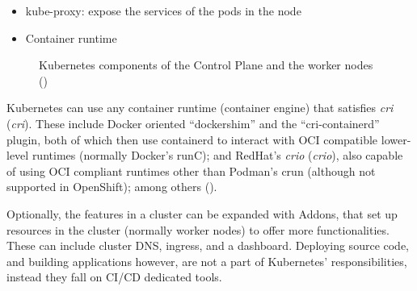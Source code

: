 \documentclass[11pt]{article}
\begin{document}
\begin{flushleft}
\begin{itemize}
            \item kube-proxy: expose the services of the pods in the node
            
            \item Container runtime

        \end{itemize}

    
    \begin{figure}[htb]
		\centering
		\caption{Kubernetes components of the Control Plane and the worker nodes (\cite{kubernetesmarko})}
	\end{figure}

    Kubernetes can use any container runtime (container engine) that satisfies \textit{\acrshort{cri}} (\textit{\acrlong{cri}}). These include Docker oriented ``dockershim'' and the ``cri-containerd'' plugin, both of which then use containerd to interact with OCI compatible lower-level runtimes (normally Docker's runC); and RedHat's \textit{\acrshort{crio}} (\textit{\acrlong{crio}}), also capable of using OCI compliant runtimes other than Podman's crun (although not supported in OpenShift); among others (\cite{k8scri}).
    \linebreak
    
    Optionally, the features in a cluster can be expanded with Addons, that set up resources in the cluster (normally worker nodes) to offer more functionalities. These can include cluster DNS, ingress, and a dashboard. Deploying source code, and building applications however, are not a part of Kubernetes' responsibilities, instead they fall on CI/CD dedicated tools.
    \linebreak
    

\end{flushleft}
\end{document}
